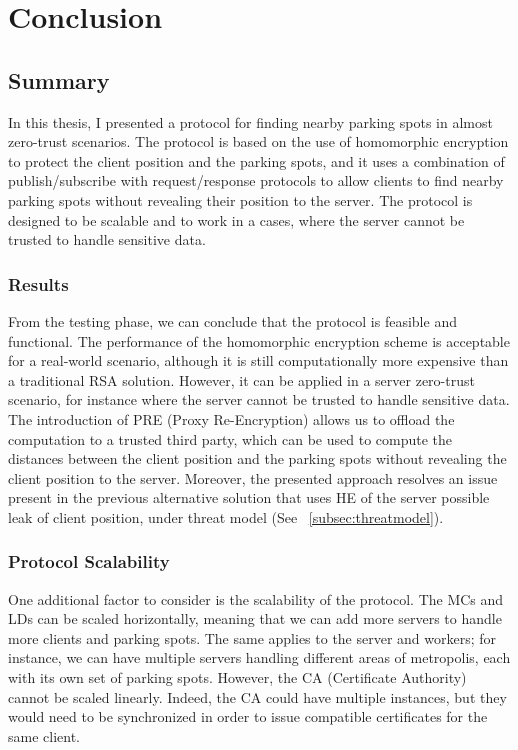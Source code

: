 \chapter{Conclusion}

\section{Summary}

In this thesis, I presented a protocol for finding nearby parking spots in almost zero-trust scenarios. The protocol is based on the use of homomorphic encryption to protect the client position and the parking spots, and it uses a combination of publish/subscribe with request/response protocols to allow clients to find nearby parking spots without revealing their position to the server. The protocol is designed to be scalable and to work in a cases, where the server cannot be trusted to handle sensitive data.

\subsection{Results}

From the testing phase, we can conclude that the protocol is feasible and functional. The performance of the homomorphic encryption scheme is acceptable for a real-world scenario, although it is still computationally more expensive than a traditional RSA solution. However, it can be applied in a server zero-trust scenario, for instance where the server cannot be trusted to handle sensitive data. The introduction of PRE (Proxy Re-Encryption) allows us to offload the computation to a trusted third party, which can be used to compute the distances between the client position and the parking spots without revealing the client position to the server. Moreover, the presented approach resolves an issue present in the previous alternative solution that uses HE of the server possible leak of client position, under threat model (See ~\cref{subsec:threatmodel}).

\subsection{Protocol Scalability}

One additional factor to consider is the scalability of the protocol. The MCs and LDs can be scaled horizontally, meaning that we can add more servers to handle more clients and parking spots. The same applies to the server and workers; for instance, we can have multiple servers handling different areas of metropolis, each with its own set of parking spots. However, the CA (Certificate Authority) cannot be scaled linearly. Indeed, the CA could have multiple instances, but they would need to be synchronized in order to issue compatible certificates for the same client.

